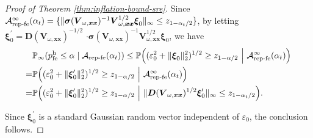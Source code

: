 \documentclass[12pt]{article}
\newcommand{\hpfe}{p_\textnormal{fe}^{\textnormal{h}}}
\newcommand{\Prob}{\mathbb{P}}
\newcommand{\ma}{\mathcal{A}}
\newcommand{\repfe}{\textnormal{rep-fe}}
\newcommand{\bs}{\boldsymbol}
\begin{document}
\begin{proof}[Proof of Theorem \ref{thm:inflation-bound-sre}]
Since $\ma_{\repfe}^\infty(\alpha_t) = \{ \|\bs{\sigma}(\bs{V}_{\omega,\bs{x}\bs{x}})^{-1}\bs{V}_{\omega,\bs{x}\bs{x}}^{1/2}\bs{\xi}_0\|_{\infty} \leq z_{1-\alpha_t/2}\}$, by letting $\bs{\xi}_0^\prime = \bs{D}(\bs{V}_{\omega,\bs{x}\bs{x}})^{-1/2} $ $ \cdot\bs{\sigma}(\bs{V}_{\omega,\bs{x}\bs{x}})^{-1}\bs{V}_{\omega, \bs{x}\bs{x}}^{1/2}\bs{\xi}_0$, we have
\begin{align*}
    &\Prob_{\infty} (\hpfe \leq \alpha \mid \ma_{\repfe}(\alpha_t)) \leq \Prob\Big((\varepsilon_0^2 + \|\bs{\xi}_0\|_2^2)^{1/2} \geq z_{1-\alpha/2}~\Big | ~\ma_{\repfe}^\infty(\alpha_t)\Big) \\
    =&\Prob\Big((\varepsilon_0^2 + \|\bs{\xi}_0^\prime\|_2^2)^{1/2}\geq z_{1-\alpha/2}~\Big | ~ \ma_{\repfe}^\infty(\alpha_t)\Big)\\
    =& \Prob\Big((\varepsilon_0^2 + \|\bs{\xi}_0^\prime\|_2^2)^{1/2}\geq z_{1-\alpha/2}~\Big | ~ \|\bs{D}(\bs{V}_{\omega,\bs{x}\bs{x}})^{1/2}\bs{\xi}_0^\prime\|_{\infty} \leq z_{1-\alpha_t/2}\Big).
\end{align*}

Since $\bs{\xi}_0^\prime$ is a standard Gaussian random vector independent of $\varepsilon_0$, the conclusion follows.
\end{proof}
\end{document}
